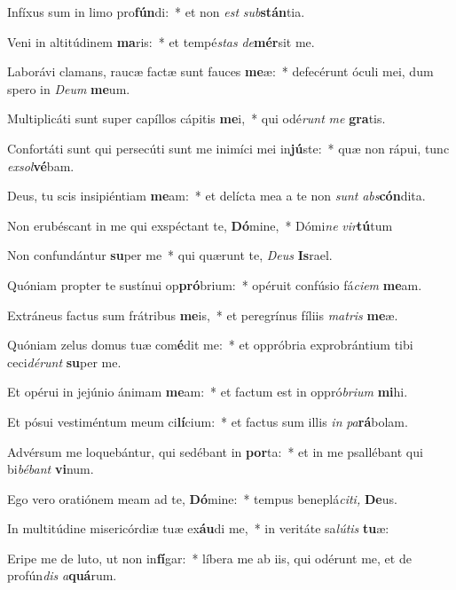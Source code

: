 \item Infíxus sum in limo pro\textbf{fún}di:~* et non \textit{est} \textit{sub}\textbf{stán}tia.
\item Veni in altitúdinem \textbf{ma}ris:~* et tempé\textit{stas} \textit{de}\textbf{mér}sit me.
\item Laborávi clamans, raucæ factæ sunt fauces \textbf{me}æ:~* defecérunt óculi mei, dum spero in \textit{Deum} \textbf{me}um.
\item Multiplicáti sunt super capíllos cápitis \textbf{me}i,~* qui odé\textit{runt} \textit{me} \textbf{gra}tis.
\item Confortáti sunt qui persecúti sunt me inimíci mei in\textbf{jú}ste:~* quæ non rápui, tunc \textit{exsol}\textbf{vé}bam.
\item Deus, tu scis insipiéntiam \textbf{me}am:~* et delícta mea a te non \textit{sunt} \textit{abs}\textbf{cón}dita.
\item Non erubéscant in me qui exspéctant te, \textbf{Dó}mine,~* Dómi\textit{ne} \textit{vir}\textbf{tú}tum
\item Non confundántur \textbf{su}per me~* qui quærunt te, \textit{Deus} \textbf{Is}rael.
\item Quóniam propter te sustínui op\textbf{pró}brium:~* opéruit confúsio fá\tinyhspace\textit{ciem} \textbf{me}am.
\item Extráneus factus sum frátribus \textbf{me}is,~* et peregrínus f\hspace*{-0.01em}íliis \textit{matris} \textbf{me}æ.
\item Quóniam zelus domus tuæ com\textbf{é}dit me:~* et oppróbria exprobrántium tibi ceci\hspace*{0.01em}\textit{dérunt} \textbf{su}per me.
\item Et opérui in jejúnio ánimam \textbf{me}am:~* et factum est in oppró\textit{brium} \textbf{mi}hi.
\item Et pósui vestiméntum meum ci\textbf{lí}cium:~* et factus sum illis \textit{in} \textit{pa}\textbf{rá}bolam.
\item Advérsum me loquebántur, qui sedébant in \textbf{por}ta:~* et in me psallébant qui bi\tinyhspace\textit{bébant} \textbf{vi}num.
\item Ego vero oratiónem meam ad te, \textbf{Dó}mine:~* tempus beneplá\tinyhspace\textit{citi,} \textbf{De}us.
\item In multitúdine misericórdiæ tuæ ex\textbf{áu}di me,~* in veritáte sa\tinyhspace\textit{lútis} \textbf{tu}æ:
\item Eripe me de luto, ut non in\textbf{fí}gar:~* líbera me ab iis, qui odérunt me, et de profún\textit{dis} \textit{a}\textbf{quá}rum.
